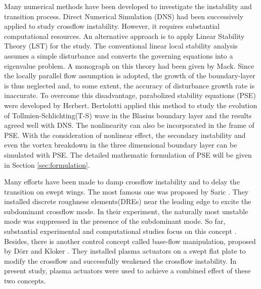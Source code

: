 \documentclass{AIAA}
\begin{document}
Many numerical methods have been developed to investigate the instability and transition process. Direct Numerical Simulation (DNS) had been successively applied to study crossflow instability\cite{Wassermann2005,Bonfigli2007,Duan2013,Hosseini2013}. However, it requires substantial computational resources. An alternative approach is to apply  Linear Stability Theory (LST) for the study. The conventional linear local stability analysis assumes a simple  disturbance and converts the governing equations into a eigenvalue problem. A monograph on this theory had been given by Mack\cite{Mack1984}. Since the locally parallel flow assumption is adopted, the growth of the boundary-layer  is thus neglected  and, to some extent, the  accuracy of disturbance growth rate is inaccurate. To overcome this disadvantage, parabolized stability equations (PSE) were developed by Herbert\cite{Herbert1987,Herbert1997,Herbert1993}. Bertolotti \cite{Bertolotti1991,Bertolotti1992} applied this method to study the evolution of Tollmien-Schlichting(T-S) wave in the Blasius boundary layer and the results agreed well with DNS. The nonlinearity can also be incorporated in the frame of PSE\cite{Hein2005}. With the consideration of nonlinear effect, the secondary instability and even the vortex breakdown in the three dimensional boundary layer can be simulated with PSE\cite{LiFei2011,Li2015a}. The detailed mathematic formulation of PSE will be given in Section \ref{sec:formulation}.

Many efforts have been made to damp crossflow instability and to delay the transition on swept wings. The most famous one was proposed by Saric \cite{Saric1998}. They installed discrete roughness elements(DREs) near the leading edge to excite the subdominant crossflow mode. In their experiment, the naturally most unstable mode was suppressed in the presence of the subdominant mode. So far, substantial experimental and computational studies focus on this concept \cite{Malik1999,Haynes2000,Wassermann2002,Carpenter2008,LiFei2011,Hosseini2013,Li2015a}. Besides, there is another control concept called base-flow manipulation, proposed by D\"orr and Kloker \cite{dorr2015stabilisation}. They installed plasma actuators on a swept flat plate to modify the crossflow and successfully weakened the crossflow instability. In present study, plasma actuators were used to achieve a combined effect of these two concepts.
\end{document}

